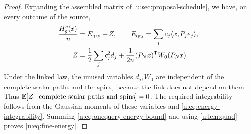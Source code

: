 \begin{proof}
Expanding the assembled matrix of \cref{u:sec:proposal-schedule},
we have, on every outcome of the source,
\begin{equation}\label{u:eq:fine-energy-decomposition}
 \begin{aligned}
 \frac{H^c_g(x)}n&=E_{\rm qry}+Z,\qquad
 E_{\rm qry}=\sum_j c_j\langle x,P_je_j\rangle,\\
 Z&=\frac12\sum_j c_j^2d_j
       +\frac1{2n}(P_Nx)^{\mathsf T}W_0(P_Nx).
 \end{aligned}
\end{equation}
Under the linked law, the unused variables $d_j,W_0$ are independent of
the complete scalar paths and the spins, because the link does not depend on them.
Thus $\mathbb E[Z\mid\text{complete scalar paths and spins}]=0$.
The required integrability follows from the Gaussian moments of these variables and \eqref{u:eq:energy-integrability}.
Summing \eqref{u:eq:onequery-energy-bound} and using
\cref{u:lem:quad} proves \eqref{u:eq:fine-energy}.
\end{proof}

